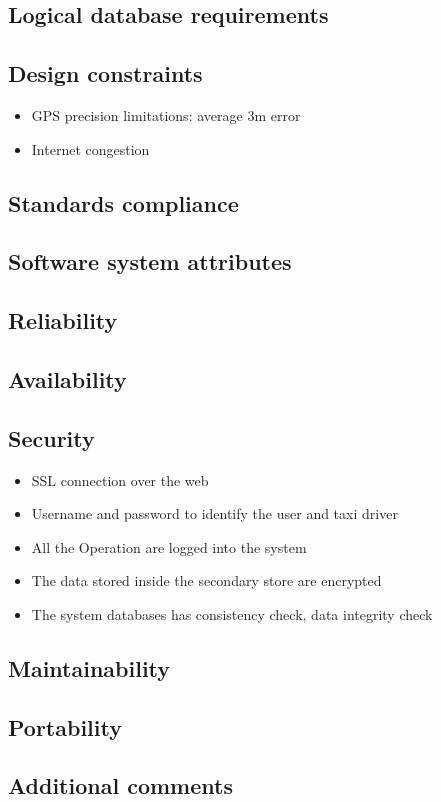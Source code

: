 \documentclass[english]{article}
\begin{document}
\subsection{Logical database requirements}


\subsection{Design constraints}
\begin{itemize}
\item GPS precision limitations: average 3m error 
\item Internet congestion 
\end{itemize}

\subsection{Standards compliance}


\subsection{Software system attributes}


\subsection{Reliability}


\subsection{Availability}


\subsection{Security}
\begin{itemize}
\item SSL connection over the web 
\item Username and password to identify the user and taxi driver 
\item All the Operation are logged into the system 
\item The data stored inside the secondary store are encrypted 
\item The system databases has consistency check, data integrity check 
\end{itemize}

\subsection{Maintainability}


\subsection{Portability}

\subsection{Additional comments}
\end{document}
